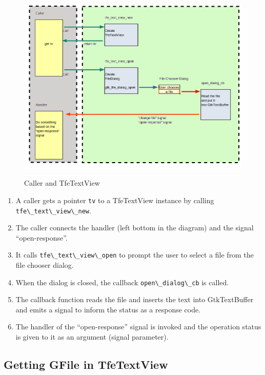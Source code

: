 \begin{figure}
\centering
\includegraphics[width=12.405cm,height=9.225cm]{../image/open.png}
\caption{Caller and TfeTextView}
\end{figure}

\begin{enumerate}
\def\labelenumi{\arabic{enumi}.}
\tightlist
\item
  A caller gets a pointer \passthrough{\lstinline!tv!} to a TfeTextView
  instance by calling \passthrough{\lstinline!tfe\_text\_view\_new!}.
\item
  The caller connects the handler (left bottom in the diagram) and the
  signal ``open-response''.
\item
  It calls \passthrough{\lstinline!tfe\_text\_view\_open!} to prompt the
  user to select a file from the file chooser dialog.
\item
  When the dialog is closed, the callback
  \passthrough{\lstinline!open\_dialog\_cb!} is called.
\item
  The callback function reads the file and inserts the text into
  GtkTextBuffer and emits a signal to inform the status as a response
  code.
\item
  The handler of the ``open-response'' signal is invoked and the
  operation status is given to it as an argument (signal parameter).
\end{enumerate}

\subsection{Getting GFile in
TfeTextView}\label{getting-gfile-in-tfetextview}

